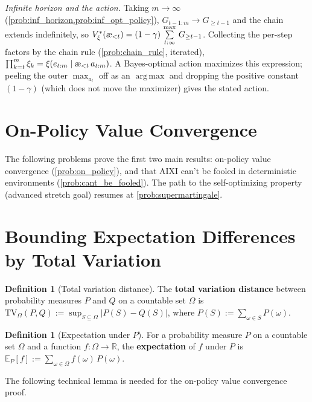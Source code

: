 \documentclass[fontsize=11pt, parskip=half]{scrartcl}
\theoremstyle{definition}
\newtheorem{definition}[theorem]{Definition}
\newenvironment{solution}{%
    \begin{tcolorbox}[colback=black!5!white, colframe=black!50!white,
      title={\textbf{Solution}}, fonttitle=\normalfont, breakable]
  }{\end{tcolorbox}}
\newenvironment{solution}{\expandafter\comment}{\expandafter\endcomment}
\newcommand{\Ex}{\mathbb{E}}
\DeclareMathOperator*{\argmax}{arg\,max}
\newcommand{\exmaxsym}{\mathop{\mathchoice
  {\overset{\textstyle\max}{\textstyle\sum}}%
  {\overset{\max}{\sum}}%
  {\overset{\scriptstyle\max}{\scriptstyle\sum}}%
  {\overset{\scriptscriptstyle\max}{\scriptscriptstyle\sum}}}}
\newcommand{\exmax}{\exmaxsym\limits}
\newcommand{\TV}[1][]{\mathrm{TV}_{#1}}
\newcommand{\aes}{\textnormal{\ae}}
\begin{document}
\begin{solution}
\emph{Infinite horizon and the action.} Taking $m \to \infty$ (\cref{prob:inf_horizon,prob:inf_opt_policy}), $G_{t-1:m} \to G_{\geq t-1}$ and the chain extends indefinitely, so $V_\xi^*(\aes_{<t}) = (1-\gamma)\, \exmax_{t:\infty}\, G_{\geq t-1}$. Collecting the per-step factors by the chain rule (\cref{prob:chain_rule}, iterated), $\prod_{k=t}^{m} \xi_k = \xi(e_{t:m} \mid \aes_{<t}\, a_{t:m})$. A Bayes-optimal action maximizes this expression; peeling the outer $\max_{a_t}$ off as an $\argmax$ and dropping the positive constant $(1-\gamma)$ (which does not move the maximizer) gives the stated action.
\end{solution}


\section*{On-Policy Value Convergence}

The following problems prove the first two main results: on-policy value convergence (\cref{prob:on_policy}), and that AIXI can't be fooled in deterministic environments (\cref{prob:cant_be_fooled}).
The path to the self-optimizing property (advanced stretch goal) resumes at \cref{prob:supermartingale}.

\section{Bounding Expectation Differences by Total Variation}\label{prob:tv_bound}

\begin{definition}[Total variation distance]\label{def:tv}
The \textbf{total variation distance} between probability measures $P$ and $Q$ on a countable set $\Omega$ is $\TV[\Omega](P, Q) := \sup_{S \subseteq \Omega} |P(S) - Q(S)|$, where $P(S) := \sum_{\omega \in S} P(\omega)$.
\end{definition}

\begin{definition}[Expectation under $P$]\label{def:expectation_P}
For a probability measure $P$ on a countable set $\Omega$ and a function $f : \Omega \to \mathbb{R}$, the \textbf{expectation} of $f$ under $P$ is
$\Ex_P[f] := \sum_{\omega \in \Omega} f(\omega)\, P(\omega)$.
\end{definition}

The following technical lemma is needed for the on-policy value convergence proof.
\end{document}
